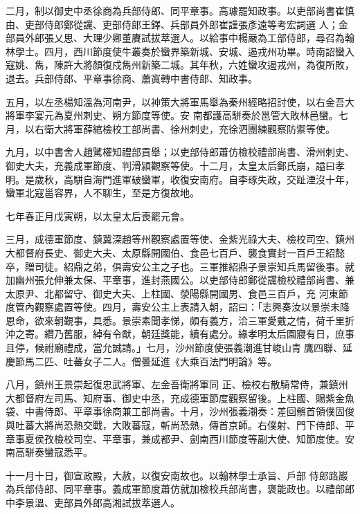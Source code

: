 \begin{pinyinscope}
 二月，制以御史中丞徐商為兵部侍郎、同平章事。高璩罷知政事。以吏部尚書崔慎由、吏部侍郎鄭從讜、吏部侍郎王鐸、兵部員外郎崔謹張彥遠等考宏詞選
 人；金部員外郎張乂思、大理少卿董賡試拔萃選人。以給事中楊嚴為工部侍郎，尋召為翰林學士。四月，西川節度使牛叢奏於蠻界築新城、安城、遏戎州功畢。時南詔蠻入寇姚、雋，陳許大將顏復戍雋州新築二城。其年秋，六姓蠻攻遏戎州，為復所敗，退去。兵部侍郎、平章事徐商、蕭寘轉中書侍郎、知政事。



 五月，以左丞楊知溫為河南尹，以神策大將軍馬舉為秦州經略招討使，以右金吾大將軍李宴元為夏州刺史、朔方節度等使。安
 南都護高駢奏於邕管大敗林邑蠻。七月，以右衛大將軍薛綰檢校工部尚書、徐州刺史，充徐泗團練觀察防禦等使。



 九月，以中書舍人趙騭權知禮部貢舉；以吏部侍郎蕭仿檢校禮部尚書、滑州刺史、御史大夫，充義成軍節度、判滑潁觀察等使。十二月，太皇太后鄭氏崩，謚曰孝明。是歲秋，高駢自海門進軍破蠻軍，收復安南府。自李琢失政，交趾湮沒十年，蠻軍北寇邕容界，人不聊生，至是方復故地。



 七年春正月戊寅朔，以太皇太后喪罷元會。



 三月，成德軍節度、鎮冀深趙等州觀察處置等使、金紫光祿大夫、檢校司空、鎮州大都督府長史、御史大夫、太原縣開國伯、食邑七百戶、襲食實封一百戶王紹懿卒，贈司徒。紹鼎之弟，俱壽安公主之子也。三軍推紹鼎子景崇知兵馬留後事。就加幽州張允伸兼太保、平章事，進封燕國公。以吏部侍郎鄭從讜檢校禮部尚書、兼太原尹、北都留守、御史大夫、上柱國、滎陽縣開國男、食邑三百戶，充
 河東節度管內觀察處置等使。四月，壽安公主上表請入朝，詔曰：「志興奏汝以景崇未降恩命，欲來朝覲事，具悉。景崇素聞孝悌，頗有義方，洽三軍愛戴之情，荷千里折沖之寄。纘乃舊服，綽有令猷，朝廷獎能，續有處分。緣孝明太后園寢有日，庶事且停，候祔廟禮成，當允誠請。」七月，沙州節度使張義潮進甘峻山青鷹四聯、延慶節馬二匹、吐蕃女子二人。僧曇延進《大乘百法門明論》等。



 八月，鎮州王景崇起復忠武將軍、左金吾衛將軍同
 正、檢校右散騎常侍，兼鎮州大都督府左司馬、知府事、御史中丞，充成德軍節度觀察留後。上柱國、賜紫金魚袋、中書侍郎、平章事徐商兼工部尚書。十月，沙州張義潮奏：差回鶻首領僕固俊與吐蕃大將尚恐熱交戰，大敗蕃寇，斬尚恐熱，傳首京師。右僕射、門下侍郎、平章事夏侯孜檢校司空、平章事，兼成都尹、劍南西川節度等副大使、知節度使。安南高駢奏蠻寇悉平。



 十一月十日，御宣政殿，大赦，以復安南故也。以翰林學士承旨、戶部
 侍郎路巖為兵部侍郎、同平章事。義成軍節度蕭仿就加檢校兵部尚書，褒能政也。以禮部郎中李景溫、吏部員外郎高湘試拔萃選人。




\end{pinyinscope}
